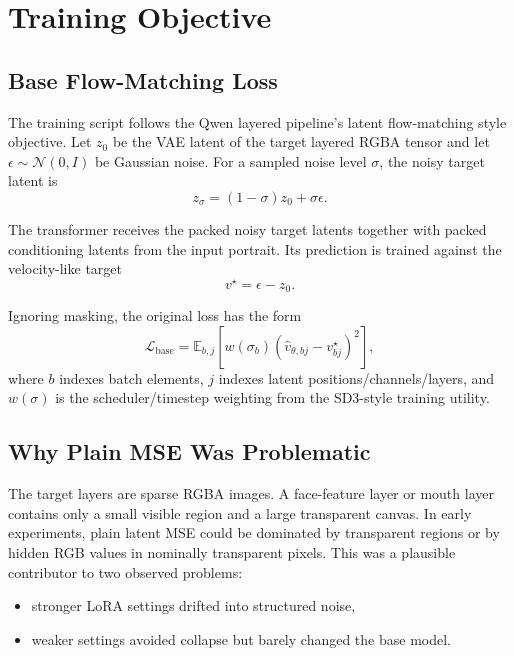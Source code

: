\documentclass[11pt]{article}
\begin{document}
\section{Training Objective}

\subsection{Base Flow-Matching Loss}

The training script follows the Qwen layered pipeline's latent flow-matching
style objective. Let $z_0$ be the VAE latent of the target layered RGBA tensor and
let $\epsilon\sim\mathcal{N}(0,I)$ be Gaussian noise. For a sampled noise level
$\sigma$, the noisy target latent is
\begin{equation}
z_\sigma = (1-\sigma)z_0 + \sigma \epsilon.
\end{equation}

The transformer receives the packed noisy target latents together with packed
conditioning latents from the input portrait. Its prediction is trained against
the velocity-like target
\begin{equation}
v^\star = \epsilon - z_0.
\end{equation}

Ignoring masking, the original loss has the form
\begin{equation}
\mathcal{L}_{\mathrm{base}}
=
\mathbb{E}_{b,j}
\left[
w(\sigma_b)
\left(
\hat{v}_{\theta,bj}-v^\star_{bj}
\right)^2
\right],
\end{equation}
where $b$ indexes batch elements, $j$ indexes latent positions/channels/layers,
and $w(\sigma)$ is the scheduler/timestep weighting from the SD3-style training
utility.

\subsection{Why Plain MSE Was Problematic}

The target layers are sparse RGBA images. A face-feature layer or mouth layer
contains only a small visible region and a large transparent canvas. In early
experiments, plain latent MSE could be dominated by transparent regions or by
hidden RGB values in nominally transparent pixels. This was a plausible contributor
to two observed problems:

\begin{itemize}[leftmargin=*]
    \item stronger LoRA settings drifted into structured noise,
    \item weaker settings avoided collapse but barely changed the base model.
\end{itemize}
\end{document}
